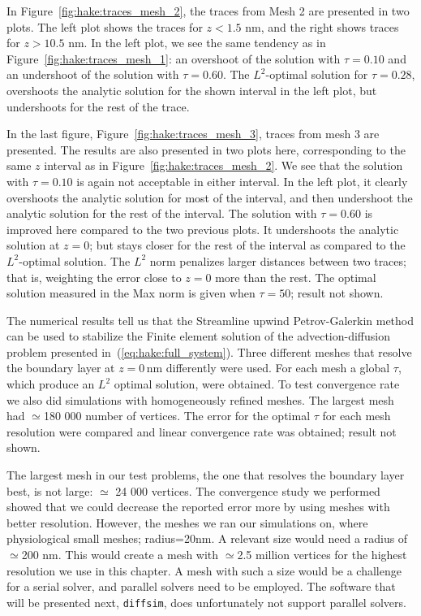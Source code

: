 In Figure~\ref{fig:hake:traces_mesh_2}, the traces from Mesh 2 are
presented in two plots. The left plot shows the traces for $z<1.5$ nm,
and the right shows traces for $z>10.5$ nm. In the left plot, we see
the same tendency as in Figure~\ref{fig:hake:traces_mesh_1}: an
overshoot of the solution with $\tau=0.10$ and an undershoot of the
solution with $\tau=0.60$. The $L^2$-optimal solution for $\tau=0.28$,
overshoots the analytic solution for the shown interval in the left
plot, but undershoots for the rest of the trace.

In the last figure, Figure~\ref{fig:hake:traces_mesh_3}, traces from
mesh 3 are presented. The results are also presented in two plots
here, corresponding to the same $z$ interval as in
Figure~\ref{fig:hake:traces_mesh_2}. We see that the solution with
$\tau=0.10$ is again not acceptable in either interval. In the left
plot, it clearly overshoots the analytic solution for most of the
interval, and then undershoot the analytic solution for the rest of
the interval. The solution with $\tau=0.60$ is improved here compared
to the two previous plots. It undershoots the analytic solution at
$z=0$; but stays closer for the rest of the interval as compared to
the $L^2$-optimal solution. The $L^2$ norm penalizes larger distances
between two traces; that is, weighting the error close to $z=0$ more
than the rest. The optimal solution measured in the Max norm is given
when $\tau=50$; result not shown.

The numerical results tell us that the Streamline upwind
Petrov-Galerkin method can be used to stabilize the Finite element
solution of the advection-diffusion problem presented
in~(\ref{eq:hake:full_system}). Three different meshes that resolve
the boundary layer at $z=0\,\mathrm{nm}$ differently were used. For
each mesh a global $\tau$, which produce an $L^2$ optimal solution,
were obtained. To test convergence rate we also did simulations with
homogeneously refined meshes. The largest mesh had $\simeq$180 000
number of vertices. The error for the optimal $\tau$ for each mesh
resolution were compared and linear convergence rate was obtained;
result not shown.

The largest mesh in our test problems, the one that resolves the
boundary layer best, is not large: $\simeq$ 24 000 vertices. The
convergence study we performed showed that we could decrease the
reported error more by using meshes with better resolution. However,
the meshes we ran our simulations on, where physiological small
meshes; radius=20nm. A relevant size would need a radius of
$\simeq$200 nm. This would create a mesh with $\simeq$2.5 million
vertices for the highest resolution we use in this chapter. A mesh
with such a size would be a challenge for a serial solver, and
parallel solvers need to be employed. The software that will be
presented next, \texttt{diffsim}, does unfortunately not support
parallel solvers.

